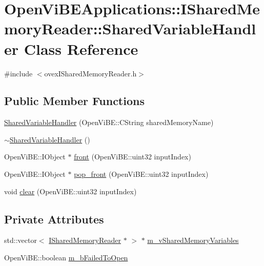 \hypertarget{classOpenViBEApplications_1_1ISharedMemoryReader_1_1SharedVariableHandler}{
\section{OpenViBEApplications::ISharedMemoryReader::SharedVariableHandler Class Reference}
\label{classOpenViBEApplications_1_1ISharedMemoryReader_1_1SharedVariableHandler}
}


{\ttfamily \#include $<$ovexISharedMemoryReader.h$>$}

\subsection*{Public Member Functions}
\begin{DoxyCompactItemize}
\item 
\hyperlink{classOpenViBEApplications_1_1ISharedMemoryReader_1_1SharedVariableHandler_abc7ac61cf1b8e626819446395721d9ce}{SharedVariableHandler} (OpenViBE::CString sharedMemoryName)
\item 
\hyperlink{classOpenViBEApplications_1_1ISharedMemoryReader_1_1SharedVariableHandler_a190f07d2f88b05e012c5a87d5efe3b3c}{$\sim$SharedVariableHandler} ()
\item 
OpenViBE::IObject $\ast$ \hyperlink{classOpenViBEApplications_1_1ISharedMemoryReader_1_1SharedVariableHandler_a9fc5074281b94f353e1bd02fbbcb250d}{front} (OpenViBE::uint32 inputIndex)
\item 
OpenViBE::IObject $\ast$ \hyperlink{classOpenViBEApplications_1_1ISharedMemoryReader_1_1SharedVariableHandler_a084c0dee9e76f22e9684e982a482e8fb}{pop\_\-front} (OpenViBE::uint32 inputIndex)
\item 
void \hyperlink{classOpenViBEApplications_1_1ISharedMemoryReader_1_1SharedVariableHandler_a3d5c4312d65e6feafeb7ebe217f0991e}{clear} (OpenViBE::uint32 inputIndex)
\end{DoxyCompactItemize}
\subsection*{Private Attributes}
\begin{DoxyCompactItemize}
\item 
std::vector$<$ \hyperlink{classOpenViBEApplications_1_1ISharedMemoryReader}{ISharedMemoryReader} $\ast$ $>$ $\ast$ \hyperlink{classOpenViBEApplications_1_1ISharedMemoryReader_1_1SharedVariableHandler_a917fa226452689369512d88779ecca5d}{m\_\-vSharedMemoryVariables}
\item 
OpenViBE::boolean \hyperlink{classOpenViBEApplications_1_1ISharedMemoryReader_1_1SharedVariableHandler_a786e8776654876e573480d8a01ca9def}{m\_\-bFailedToOpen}
\end{DoxyCompactItemize}


